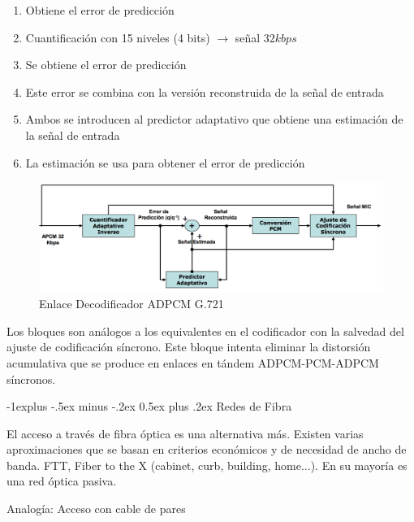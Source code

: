 \documentclass[10pt,portrait, twocolumn]{article}
\makeatletter
\renewcommand{\subsection}{\@startsection{subsection}{2}{0mm}%
                                {-1explus -.5ex minus -.2ex}%
                                {0.5ex plus .2ex}%
                                {\normalfont\normalsize\bfseries}}
\makeatother
\begin{document}
	\begin{enumerate}
		\item Obtiene el error de predicción
		\item Cuantificación con 15 niveles (4 bits) $\rightarrow$ señal $32 kbps$
		\item Se obtiene el error de predicción
		\item Este error se combina con la versión reconstruida de la señal de entrada
		\item Ambos se introducen al predictor adaptativo que obtiene una estimación de la señal de entrada
		\item La estimación se usa para obtener el error de predicción
	\end{enumerate}
	

	\begin{figure}[!ht]
 		\centering
  		 \includegraphics[scale = 0.4]{images/ADPCM2}
		\caption{Enlace Decodificador ADPCM G.721}
	\end{figure}
	
Los bloques son análogos a los equivalentes en el codificador con la salvedad del ajuste de codificación síncrono. Este bloque intenta eliminar la distorsión acumulativa que se produce en enlaces en tándem ADPCM-PCM-ADPCM síncronos.	
	
\hrulefill

\subsection{Redes de Fibra}

El acceso a través de fibra óptica es una alternativa más. Existen varias aproximaciones que se basan en criterios económicos y de necesidad de ancho de banda. FTT, Fiber to the X (cabinet, curb, building, home...). En su mayoría es una red óptica pasiva. 

Analogía: Acceso con cable de pares
	
\end{document}
